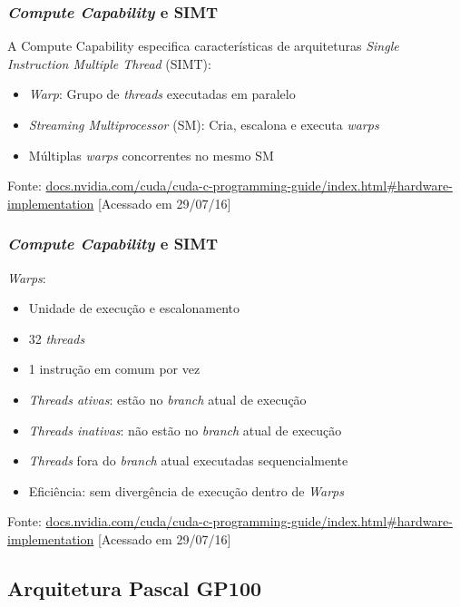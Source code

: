 \documentclass[10pt, compress, aspectratio=43, xcolor={table,usenames,dvipsnames}]{beamer}
\begin{document}
\begin{frame}
    \frametitle{\textit{Compute Capability} e SIMT}
    A \alert{Compute Capability} especifica características de
    arquiteturas \textit{Single Instruction Multiple Thread} (SIMT):
    \begin{itemize}
        \item \textit{Warp}: Grupo de \textit{threads} executadas em \alert{paralelo}
        \item \textit{Streaming Multiprocessor} (SM): Cria, escalona e executa \textit{warps}
        \item Múltiplas \textit{warps} \alert{concorrentes} no mesmo SM
    \end{itemize}
    \vfill

    \begin{center}
        \tiny{Fonte: \url{docs.nvidia.com/cuda/cuda-c-programming-guide/index.html\#hardware-implementation} [Acessado em 29/07/16]}
    \end{center}
\end{frame}

\begin{frame}
    \frametitle{\textit{Compute Capability} e SIMT}
    \textit{Warps}:
    \begin{itemize}
        \item Unidade de execução e escalonamento
        \item 32 \textit{threads}
        \item 1 \alert{instrução em comum} por vez
        \item \textit{Threads ativas}: estão no \textit{branch} atual de
            execução
        \item \textit{Threads inativas}: \alert{não} estão no \textit{branch}
            atual de execução
        \item \textit{Threads} fora do \textit{branch} atual executadas
            \alert{sequencialmente}
        \item Eficiência: sem divergência de execução dentro de \textit{Warps}
    \end{itemize}
    \vfill

    \begin{center}
        \tiny{Fonte: \url{docs.nvidia.com/cuda/cuda-c-programming-guide/index.html\#hardware-implementation} [Acessado em 29/07/16]}
    \end{center}
\end{frame}

\subsection{Arquitetura Pascal GP100}
\end{document}
